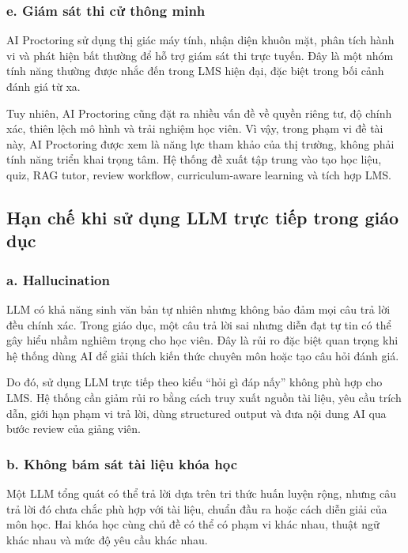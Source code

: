\subsubsection*{e. Giám sát thi cử thông minh}

AI Proctoring sử dụng thị giác máy tính, nhận diện khuôn mặt, phân tích hành vi
và phát hiện bất thường để hỗ trợ giám sát thi trực tuyến. Đây là một nhóm tính
năng thường được nhắc đến trong LMS hiện đại, đặc biệt trong bối cảnh đánh giá
từ xa.

Tuy nhiên, AI Proctoring cũng đặt ra nhiều vấn đề về quyền riêng tư, độ chính
xác, thiên lệch mô hình và trải nghiệm học viên. Vì vậy, trong phạm vi đề tài
này, AI Proctoring được xem là năng lực tham khảo của thị trường, không phải
tính năng triển khai trọng tâm. Hệ thống đề xuất tập trung vào tạo học liệu,
quiz, RAG tutor, review workflow, curriculum-aware learning và tích hợp LMS.

\subsection{Hạn chế khi sử dụng LLM trực tiếp trong giáo dục}

\subsubsection*{a. Hallucination}

LLM có khả năng sinh văn bản tự nhiên nhưng không bảo đảm mọi câu trả lời đều
chính xác. Trong giáo dục, một câu trả lời sai nhưng diễn đạt tự tin có thể gây
hiểu nhầm nghiêm trọng cho học viên. Đây là rủi ro đặc biệt quan trọng khi hệ
thống dùng AI để giải thích kiến thức chuyên môn hoặc tạo câu hỏi đánh giá.

Do đó, sử dụng LLM trực tiếp theo kiểu ``hỏi gì đáp nấy'' không phù hợp cho
LMS. Hệ thống cần giảm rủi ro bằng cách truy xuất nguồn tài liệu, yêu cầu trích
dẫn, giới hạn phạm vi trả lời, dùng structured output và đưa nội dung AI qua
bước review của giảng viên.

\subsubsection*{b. Không bám sát tài liệu khóa học}

Một LLM tổng quát có thể trả lời dựa trên tri thức huấn luyện rộng, nhưng câu
trả lời đó chưa chắc phù hợp với tài liệu, chuẩn đầu ra hoặc cách diễn giải của
môn học. Hai khóa học cùng chủ đề có thể có phạm vi khác nhau, thuật ngữ khác
nhau và mức độ yêu cầu khác nhau.

